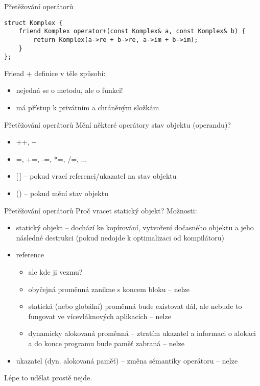 \begin{frame}[fragile]
\begin{exampleblock}{Přetěžování operátorů} 
\begin{lstlisting}
struct Komplex {
	friend Komplex operator+(const Komplex& a, const Komplex& b) {
		return Komplex(a->re + b->re, a->im + b->im);
	}
};
\end{lstlisting}
\end{exampleblock}
\begin{block}{}
Friend + definice v těle způsobí:
\begin{itemize}
\item nejedná se o metodu, ale o funkci!
\item má přístup k privátním a chráněným složkám
\end{itemize}
\end{block}
\end{frame}


\begin{frame}[fragile]
\begin{block}{Přetěžování operátorů} 
Mění některé operátory stav objektu (operandu)?
\begin{itemize}
\item ++, -\/-
\item =, +=, -=, *=, /=, $\ldots$
\item $[$\,$]$ -- pokud vrací referenci/ukazatel na stav objektu
\item () -- pokud mění stav objektu
\end{itemize}
\end{block}
\end{frame}

\begin{frame}[fragile]
\begin{block}{Přetěžování operátorů} 
Proč vracet statický objekt? Možnosti:
\begin{itemize}
\item statický objekt -- dochází ke kopírování, vytvoření dočasného objektu a jeho následné destrukci (pokud nedojde k optimalizaci od kompilátoru)
\item reference
\begin{itemize}
\item ale kde ji vezmu?
\item obyčejná proměnná zanikne s koncem bloku -- nelze
\item statická (nebo globální) proměnná bude existovat dál, ale nebude to fungovat ve vícevláknových aplikacích -- nelze
\item dynamicky alokovaná proměnná -- ztratím ukazatel a informaci o alokaci a do konce programu bude paměť zabraná -- nelze
\end{itemize}
\item ukazatel (dyn. alokovaná paměť) -- změna sémantiky operátoru -- nelze
\end{itemize}
Lépe to udělat prostě nejde.
\end{block}
\end{frame}

